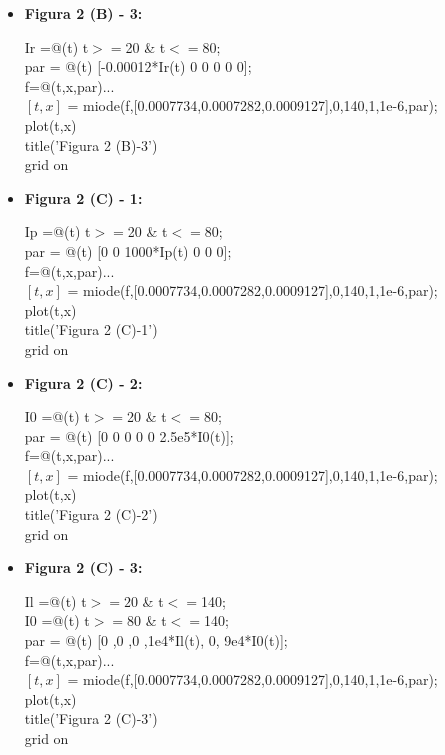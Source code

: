 \documentclass[a4paper]{article}
\begin{document}
\begin{itemize}
	\item \textbf{Figura 2 (B) - 3:}
	\begin{tabbing}
		Ir =@(t) t$>=$20 \& t$<=$80;\\
		par = @(t) [-0.00012*Ir(t) 0 0 0 0 0];\\
		f=@(t,x,par)...\\
		$[t,x]$ = miode(f,[0.0007734,0.0007282,0.0009127],0,140,1,1e-6,par);\\
		plot(t,x)\\
		title('Figura 2 (B)-3')\\
		grid on\\
	\end{tabbing}
	
	\item \textbf{Figura 2 (C) - 1:}
	\begin{tabbing}
		Ip =@(t) t$>=$20 \& t$<=$80;\\
		par = @(t) [0 0 1000*Ip(t) 0 0 0];\\
		f=@(t,x,par)...\\
		$[t,x]$ = miode(f,[0.0007734,0.0007282,0.0009127],0,140,1,1e-6,par);\\
		plot(t,x)\\
		title('Figura 2 (C)-1')\\
		grid on\\
	\end{tabbing}
	
	\item \textbf{Figura 2 (C) - 2:}
	\begin{tabbing}
		I0 =@(t) t$>=$20 \& t$<=$80;\\
		par = @(t) [0 0 0 0 0 2.5e5*I0(t)];\\
		f=@(t,x,par)...\\
		$[t,x]$ = miode(f,[0.0007734,0.0007282,0.0009127],0,140,1,1e-6,par);\\
		plot(t,x)\\
		title('Figura 2 (C)-2')\\
		grid on\\
	\end{tabbing}
	
	\item \textbf{Figura 2 (C) - 3:}
	\begin{tabbing}
		Il =@(t) t$>=20$ \& t$<=$140;\\
		I0 =@(t) t$>=$80 \& t$<=$140;\\
		par = @(t) [0 ,0 ,0 ,1e4*Il(t), 0, 9e4*I0(t)];\\
		f=@(t,x,par)...\\
		$[t,x]$ = miode(f,[0.0007734,0.0007282,0.0009127],0,140,1,1e-6,par);\\
		plot(t,x)\\
		title('Figura 2 (C)-3')\\
		grid on\\
	\end{tabbing}

\end{itemize}
	
\end{document}
